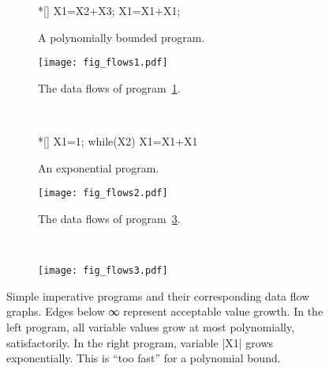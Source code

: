 \begin{figure}[H]
\centering
\begin{subfigure}{.45\textwidth}
\centering\begin{minipage}{.7\textwidth}
\begin{implisting}*[]
X1=X2+X3;
X1=X1+X1;
\end{implisting}
\end{minipage}
\caption{A polynomially bounded program.}\label{lst:simple-dfg-1}
\end{subfigure}\hfill
\begin{subfigure}{.45\textwidth}
\begin{center}
\texttt{[image: fig\_flows1.pdf]}
\end{center}
\caption{The data flows of program~\ref{lst:simple-dfg-1}.}\label{fig:simple-dfg-1}
\end{subfigure}\\[1em]
\begin{subfigure}{.45\textwidth}
\centering\begin{minipage}{.7\textwidth}
\begin{implisting}*[]
X1=1;
while(X2)
  X1=X1+X1
\end{implisting}
\end{minipage}
\caption{An exponential program.}\label{lst:simple-dfg-2}
\end{subfigure}\hfill
\begin{subfigure}{.45\textwidth}
\begin{center}
\texttt{[image: fig\_flows2.pdf]}
\end{center}
\caption{The data flows of program~\ref{lst:simple-dfg-2}.}\label{fig:simple-dfg-2}
\end{subfigure}\\[1em]
\begin{subfigure}{\textwidth}
\centering\texttt{[image: fig\_flows3.pdf]}
\end{subfigure}
\caption[Simple imperative programs and their corresponding data flow graphs]{
Simple imperative programs and their corresponding data flow graphs.
Edges below ∞ represent acceptable value growth.
In the left program, all variable values grow at most polynomially, \ie satisfactorily.
In the right program, variable \pr|X1| grows exponentially.
This is \enquote{too fast} for a polynomial bound.}
\label{fig:dfg-ex}
\end{figure}


